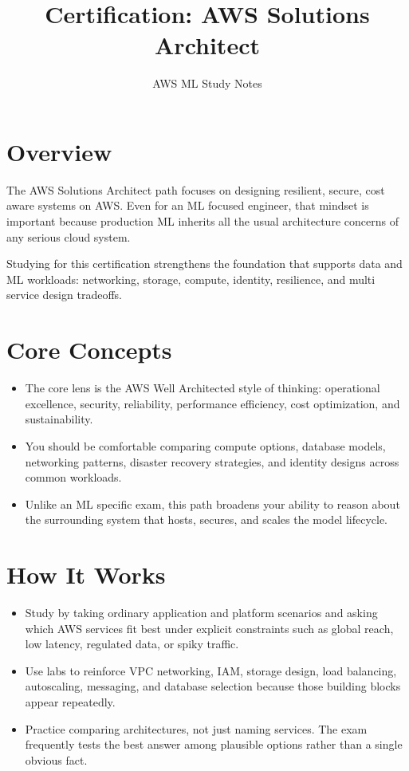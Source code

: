 \documentclass[10pt,twocolumn]{article}
\begin{document}
\title{\vspace{-1.6cm}Certification: AWS Solutions Architect}
\author{AWS ML Study Notes}
\date{}
\maketitle
\small

\section*{Overview}
The AWS Solutions Architect path focuses on designing resilient, secure, cost aware systems on AWS. Even for an ML focused engineer, that mindset is important because production ML inherits all the usual architecture concerns of any serious cloud system.

Studying for this certification strengthens the foundation that supports data and ML workloads: networking, storage, compute, identity, resilience, and multi service design tradeoffs.

\section*{Core Concepts}
\begin{itemize}
\item The core lens is the AWS Well Architected style of thinking: operational excellence, security, reliability, performance efficiency, cost optimization, and sustainability.
\item You should be comfortable comparing compute options, database models, networking patterns, disaster recovery strategies, and identity designs across common workloads.
\item Unlike an ML specific exam, this path broadens your ability to reason about the surrounding system that hosts, secures, and scales the model lifecycle.
\end{itemize}

\section*{How It Works}
\begin{itemize}
\item Study by taking ordinary application and platform scenarios and asking which AWS services fit best under explicit constraints such as global reach, low latency, regulated data, or spiky traffic.
\item Use labs to reinforce VPC networking, IAM, storage design, load balancing, autoscaling, messaging, and database selection because those building blocks appear repeatedly.
\item Practice comparing architectures, not just naming services. The exam frequently tests the best answer among plausible options rather than a single obvious fact.
\end{itemize}
\end{document}
